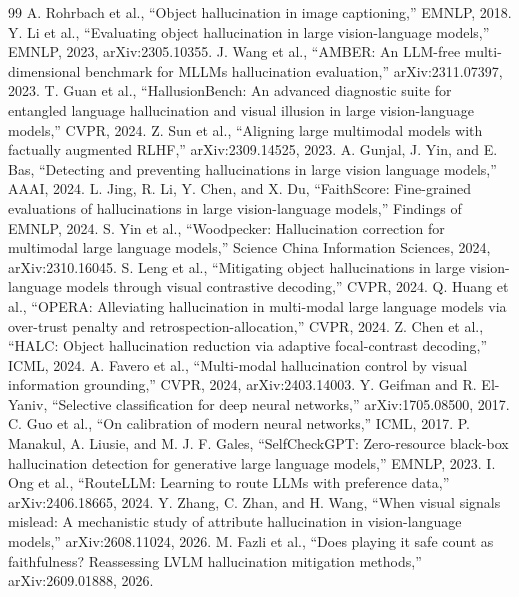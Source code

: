 \documentclass[conference]{IEEEtran}
\begin{document}
\begin{thebibliography}{99}
 A. Rohrbach et al., ``Object hallucination in image captioning,'' EMNLP, 2018.
 Y. Li et al., ``Evaluating object hallucination in large vision-language models,'' EMNLP, 2023, arXiv:2305.10355.
 J. Wang et al., ``AMBER: An LLM-free multi-dimensional benchmark for MLLMs hallucination evaluation,'' arXiv:2311.07397, 2023.
 T. Guan et al., ``HallusionBench: An advanced diagnostic suite for entangled language hallucination and visual illusion in large vision-language models,'' CVPR, 2024.
 Z. Sun et al., ``Aligning large multimodal models with factually augmented RLHF,'' arXiv:2309.14525, 2023.
 A. Gunjal, J. Yin, and E. Bas, ``Detecting and preventing hallucinations in large vision language models,'' AAAI, 2024.
 L. Jing, R. Li, Y. Chen, and X. Du, ``FaithScore: Fine-grained evaluations of hallucinations in large vision-language models,'' Findings of EMNLP, 2024.
 S. Yin et al., ``Woodpecker: Hallucination correction for multimodal large language models,'' Science China Information Sciences, 2024, arXiv:2310.16045.
 S. Leng et al., ``Mitigating object hallucinations in large vision-language models through visual contrastive decoding,'' CVPR, 2024.
 Q. Huang et al., ``OPERA: Alleviating hallucination in multi-modal large language models via over-trust penalty and retrospection-allocation,'' CVPR, 2024.
 Z. Chen et al., ``HALC: Object hallucination reduction via adaptive focal-contrast decoding,'' ICML, 2024.
 A. Favero et al., ``Multi-modal hallucination control by visual information grounding,'' CVPR, 2024, arXiv:2403.14003.
 Y. Geifman and R. El-Yaniv, ``Selective classification for deep neural networks,'' arXiv:1705.08500, 2017.
 C. Guo et al., ``On calibration of modern neural networks,'' ICML, 2017.
 P. Manakul, A. Liusie, and M. J. F. Gales, ``SelfCheckGPT: Zero-resource black-box hallucination detection for generative large language models,'' EMNLP, 2023.
 I. Ong et al., ``RouteLLM: Learning to route LLMs with preference data,'' arXiv:2406.18665, 2024.
 Y. Zhang, C. Zhan, and H. Wang, ``When visual signals mislead: A mechanistic study of attribute hallucination in vision-language models,'' arXiv:2608.11024, 2026.
 M. Fazli et al., ``Does playing it safe count as faithfulness? Reassessing LVLM hallucination mitigation methods,'' arXiv:2609.01888, 2026.
\end{thebibliography}
\end{document}
